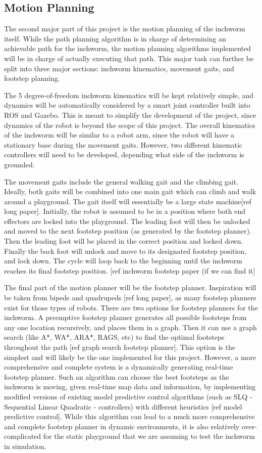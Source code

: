 \subsection{Motion Planning}
The second major part of this project is the motion planning of the inchworm itself. While the path planning algorithm is in charge of determining an achievable path for the inchworm, the motion planning algorithms implemented will be in charge of actually executing that path. This major task can further be split into three major sections: inchworm kinematics, movement gaits, and footstep planning.

The 5 degree-of-freedom inchworm kinematics will be kept relatively simple, and dynamics will be automatically considered by a smart joint controller built into ROS and Gazebo. This is meant to simplify the development of the project, since dynamics of the robot is beyond the scope of this project. The overall kinematics of the inchworm will be similar to a robot arm, since the robot will have a stationary base during the movement gaits. However, two different kinematic controllers will need to be developed, depending what side of the inchworm is grounded.

The movement gaits include the general walking gait and the climbing gait. Ideally, both gaits will be combined into one main gait which can climb and walk around a playground. The gait itself will essentially be a large state machine[ref long paper]. Initially, the robot is assumed to be in a position where both end effectors are locked into the playground. The leading foot will then be unlocked and moved to the next footstep position (as generated by the footstep planner). Then the leading foot will be placed in the correct position and locked down. Finally the back foot will unlock and move to its designated footstep position, and lock down. The cycle will loop back to the beginning until the inchworm reaches its final footstep position. [ref inchworm footstep paper (if we can find it]

The final part of the motion planner will be the footstep planner. Inspiration will be taken from bipeds and quadrupeds [ref long paper], as many footstep planners exist for those types of robots. There are two options for footstep planners for the inchworm. A preemptive footstep planner generates all possible footsteps from any one location recursively, and places them in a graph. Then it can use a graph search (like A*, WA*, ARA*, RAGS, etc) to find the optimal footsteps throughout the path [ref graph search footstep planner]. This option is the simplest and will likely be the one implemented for this project. However, a more comprehensive and complete system is a dynamically generating real-time footstep planner. Such an algorithm can choose the best footsteps as the inchworm is moving, given real-time map data and information, by implementing modified versions of existing model predictive control algorithms (such as SLQ - Sequential Linear Quadratic - controllers) with different heuristics [ref model predictive control]. While this algorithm can lead to a much more comprehensive and complete footstep planner in dynamic environments, it is also relatively over-complicated for the static playground that we are assuming to test the inchworm in simulation.